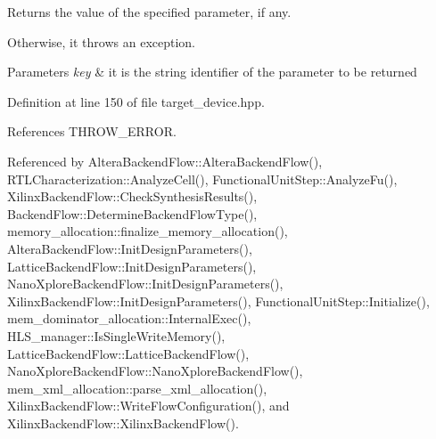 Returns the value of the specified parameter, if any. 

Otherwise, it throws an exception. 
\begin{DoxyParams}{Parameters}
{\em key} & it is the string identifier of the parameter to be returned \\
\hline
\end{DoxyParams}


Definition at line 150 of file target\+\_\+device.\+hpp.



References T\+H\+R\+O\+W\+\_\+\+E\+R\+R\+OR.



Referenced by Altera\+Backend\+Flow\+::\+Altera\+Backend\+Flow(), R\+T\+L\+Characterization\+::\+Analyze\+Cell(), Functional\+Unit\+Step\+::\+Analyze\+Fu(), Xilinx\+Backend\+Flow\+::\+Check\+Synthesis\+Results(), Backend\+Flow\+::\+Determine\+Backend\+Flow\+Type(), memory\+\_\+allocation\+::finalize\+\_\+memory\+\_\+allocation(), Altera\+Backend\+Flow\+::\+Init\+Design\+Parameters(), Lattice\+Backend\+Flow\+::\+Init\+Design\+Parameters(), Nano\+Xplore\+Backend\+Flow\+::\+Init\+Design\+Parameters(), Xilinx\+Backend\+Flow\+::\+Init\+Design\+Parameters(), Functional\+Unit\+Step\+::\+Initialize(), mem\+\_\+dominator\+\_\+allocation\+::\+Internal\+Exec(), H\+L\+S\+\_\+manager\+::\+Is\+Single\+Write\+Memory(), Lattice\+Backend\+Flow\+::\+Lattice\+Backend\+Flow(), Nano\+Xplore\+Backend\+Flow\+::\+Nano\+Xplore\+Backend\+Flow(), mem\+\_\+xml\+\_\+allocation\+::parse\+\_\+xml\+\_\+allocation(), Xilinx\+Backend\+Flow\+::\+Write\+Flow\+Configuration(), and Xilinx\+Backend\+Flow\+::\+Xilinx\+Backend\+Flow().

